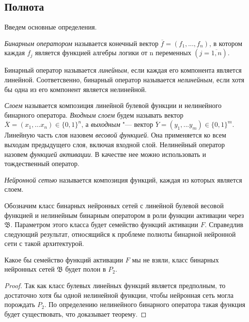 \subsection{Полнота}
    Введем основные определения.
    \begin{definition}
    \emph{Бинарным оператором} называется конечный вектор $\overline{f} = (f_1, ..., f_n)$, в котором каждая $f_j$ является функцией алгебры логики от n переменных $(j = \overline{1, n})$.
    \end{definition}
    
    \begin{definition}
    Бинарный оператор называется \emph{линейным}, если каждая его компонента является линейной. Соответсвенно, бинарный оператор называется \emph{нелинейным}, если хотя бы одна из его компонент является нелинейной.
    \end{definition}
    
    \begin{definition}
    \emph{Слоем} называется композиция линейной булевой функции  и нелинейного бинарного оператора. \emph{Входным слоем} будем называть вектор $\overline{X} = (x_1, ... x_n)\in \{0, 1\}^n$, а \emph{выходным} "--- вектор $\overline{Y} = (y_1, ... y_m)\in \{0, 1\}^m$.
    Линейную часть слоя назовем \emph{весовой функцией}. Она применяется ко всем выходам предыдущего слоя, включая входной слой.
    Нелинейный оператор назовем \emph{функцией активации}. В качестве нее можно использовать и тождественный оператор.
    \end{definition}
    
    \begin{definition}
    \emph{Нейронной сетью} называется композиция функций, каждая из которых является слоем.
    \end{definition}
    
    Обозначим класс бинарных нейронных сетей с линейной булевой весовой функцией и нелинейным бинарным оператором в роли функции активации через $\mathfrak{B}$. Параметром этого класса будет семейство функций активации $F$. Справедлив следующий результат, относящийся к проблеме полноты бинарной нейронной сети с такой архитектурой.
    
    \begin{theorem}
    Какое бы семейство функций активации $F$ мы не взяли, класс бинарных нейронных сетей $\mathfrak{B}$ будет полон в $P_2$.
    \end{theorem}
    \begin{proof}
    Так как класс булевых линейных функций является предполным, то достаточно хотя бы одной нелинейной функции, чтобы нейронная сеть могла порождать $P_2$. По определению нелинейного бинарного оператора такая функция будет существовать, что доказывает теорему.
    \end{proof}
    
